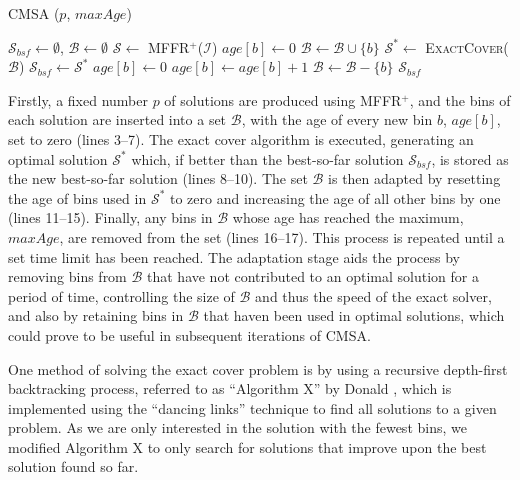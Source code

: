 \documentclass[authoryear]{elsarticle}
\begin{document}
\begin{algorithm}
\caption{\textsc{CMSA} ($p$, $maxAge$)}
\begin{algorithmic}[1]
	\State $\mathcal{S}_{bsf} \gets \emptyset$, $\mathcal{B} \gets \emptyset$
			\State $\mathcal{S} \gets$ \textsc{MFFR}$^+$($\mathcal{I}$)
					\State $age[b] \gets 0$
					\State $\mathcal{B} \gets \mathcal{B} \cup \{b\}$
				\EndFor
		\EndFor
		\State $\mathcal{S}^* \gets$ \textsc{ExactCover}($\mathcal{B}$)
			\State $\mathcal{S}_{bsf} \gets \mathcal{S}^*$
		\EndIf
				\State $age[b] \gets 0$
				\State $age[b] \gets age[b] + 1$
					\State $\mathcal{B} \gets \mathcal{B} - \{b\}$
				\EndIf
			\EndIf		
		\EndFor
	\EndWhile
	\Return $\mathcal{S}_{bsf}$
\end{algorithmic}
\label{alg:cmsa}	
\end{algorithm}	

\noindent Firstly, a fixed number $p$ of solutions are produced using MFFR$^+$, and the bins of each solution are inserted into a set $\mathcal{B}$, with the age of every new bin $b$, $age[b]$, set to zero (lines 3--7). The exact cover algorithm is executed, generating an optimal solution $\mathcal{S}^*$ which, if better than the best-so-far solution $\mathcal{S}_{bsf}$, is stored as the new best-so-far solution (lines 8--10). The set $\mathcal{B}$ is then adapted by resetting the age of bins used in $\mathcal{S}^*$ to zero and increasing the age of all other bins by one (lines 11--15). Finally, any bins in $\mathcal{B}$ whose age has reached the maximum, $maxAge$, are removed from the set (lines 16--17). This process is repeated until a set time limit has been reached. The adaptation stage aids the process by removing bins from $\mathcal{B}$ that have not contributed to an optimal solution for a period of time, controlling the size of $\mathcal{B}$ and thus the speed of the exact solver, and also by retaining bins in $\mathcal{B}$ that haven been used in optimal solutions, which could prove to be useful in subsequent iterations of CMSA.

One method of solving the exact cover problem is by using a recursive depth-first backtracking process, referred to as ``Algorithm X'' by Donald \citet{knuth2000}, which is implemented using the ``dancing links'' technique to find all solutions to a given problem. As we are only interested in the solution with the fewest bins, we modified Algorithm X to only search for solutions that improve upon the best solution found so far.
\end{document}
